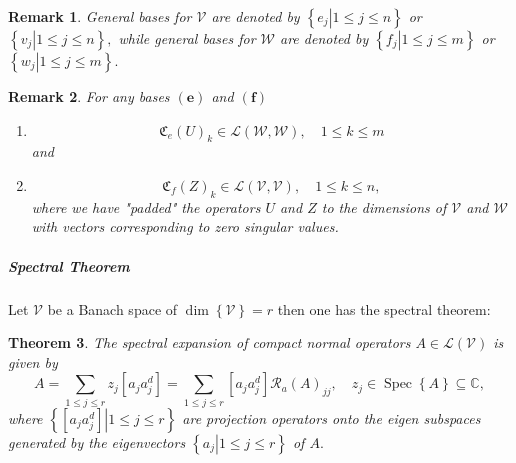 \documentclass[aps,preprint]{revtex4}%
\newtheorem{theorem}{Theorem}
\newtheorem{remark}[theorem]{Remark}
\begin{document}
\begin{remark}
General bases for $\mathcal{V}$ are denoted by $\left\{  \left.
e_{j}\right\vert 1\leq j\leq n\right\}  $ or $\left\{  \left.  v_{j}%
\right\vert 1\leq j\leq n\right\}  ,$ while general bases for $\mathcal{W}$
are denoted by $\left\{  \left.  f_{j}\right\vert 1\leq j\leq m\right\}  $ or
$\left\{  \left.  w_{j}\right\vert 1\leq j\leq m\right\}  .$
\end{remark}

\begin{remark}
For any bases $\left(  \mathbf{e}\right)  $ and $\left(  \mathbf{f}\right)  $

\begin{enumerate}
\item
\begin{equation}
\mathfrak{C}_{e}\left(  U\right)  _{k}\in\mathcal{L}\left(  \mathcal{W}%
,\mathcal{W}\right)  ,\quad1\leq k\leq m
\end{equation}
and

\item
\begin{equation}
\mathfrak{C}_{f}\left(  Z\right)  _{k}\in\mathcal{L}\left(  \mathcal{V}%
,\mathcal{V}\right)  ,\quad1\leq k\leq n,
\end{equation}
where we have "padded" the operators $U$ and $Z$ to the dimensions of
$\mathcal{V}$ and $\mathcal{W}$ with vectors corresponding to \emph{zero
singular values}.
\end{enumerate}
\end{remark}

\subparagraph{Spectral Theorem}

Let $\mathcal{V}$ be a Banach space of $\dim\left\{  \mathcal{V}\right\}  =r$
then one has the spectral theorem:

\begin{theorem}
The \emph{spectral expansion} of compact normal operators $A\in\mathcal{L}%
\left(  \mathcal{V}\right)  $ is given by
\begin{equation}
A=\sum_{1\leq j\leq r}z_{j}\left[  a_{j}a_{j}^{d}\right]  =\sum_{1\leq j\leq
r}\left[  a_{j}a_{j}^{d}\right]  \mathcal{R}_{a}\left(  A\right)  _{jj},\quad
z_{j}\in\operatorname*{Spec}\left\{  A\right\}  \subseteq\mathbb{C},
\end{equation}
where $\left\{  \left.  \left[  a_{j}a_{j}^{d}\right]  \right\vert 1\leq j\leq
r\right\}  $ are projection operators onto the eigen subspaces generated by
the eigenvectors $\left\{  \left.  a_{j}\right\vert 1\leq j\leq r\right\}  $
of $A.$
\end{theorem}
\end{document}
